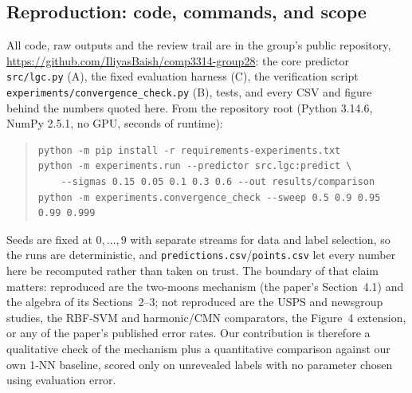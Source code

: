 \subsection{Reproduction: code, commands, and scope}\label{sec:reproduction}

All code, raw outputs and the review trail are in the group's public repository,
\url{https://github.com/IliyasBaish/comp3314-group28}: the core predictor
\texttt{src/lgc.py} (A), the fixed evaluation harness (C), the verification script
\texttt{experiments/convergence\_check.py} (B), tests, and every CSV and figure
behind the numbers quoted here. From the repository root (Python 3.14.6, NumPy
2.5.1, no GPU, seconds of runtime):

\begin{quote}\small
\begin{verbatim}
python -m pip install -r requirements-experiments.txt
python -m experiments.run --predictor src.lgc:predict \
    --sigmas 0.15 0.05 0.1 0.3 0.6 --out results/comparison
python -m experiments.convergence_check --sweep 0.5 0.9 0.95 0.99 0.999
\end{verbatim}
\end{quote}

Seeds are fixed at $0,\dots,9$ with separate streams for data and label selection, so
the runs are deterministic, and \texttt{predictions.csv}/\texttt{points.csv} let every
number here be recomputed rather than taken on trust. The boundary of that claim
matters: reproduced are the two-moons mechanism (the paper's Section~4.1) and the
algebra of its Sections~2--3; not reproduced are the USPS and newsgroup studies, the
RBF-SVM and harmonic/CMN comparators, the Figure~4 extension, or any of the paper's
published error rates. Our contribution is therefore a qualitative check of the
mechanism plus a quantitative comparison against our own 1-NN baseline, scored only
on unrevealed labels with no parameter chosen using evaluation error.

